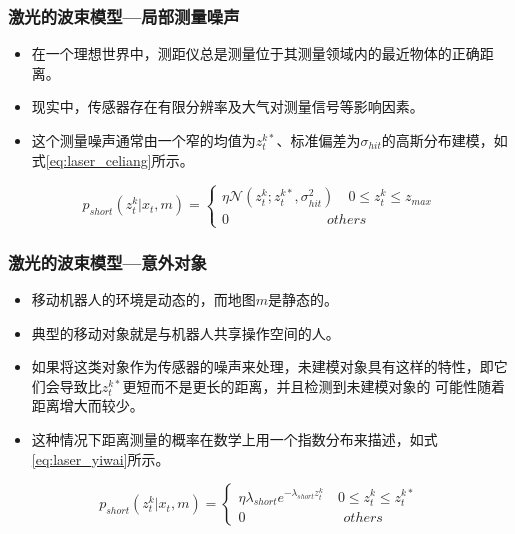 \begin{frame}
  \frametitle{激光的波束模型---局部测量噪声}
  
  \begin{itemize}
    \item 在一个理想世界中，测距仪总是测量位于其测量领域内的最近物体的正确距离。
    \item 现实中，{\color{red}传感器存在有限分辨率及大气对测量信号等影响因素}。
    \item 这个测量噪声通常由一个窄的均值为$z_t^{k*}$、标准偏差为$\sigma_{hit}$的高斯分布建模，如式\ref{eq:laser_celiang}所示。
  \end{itemize}

  \begin{equation}
    p_{short}(z_t^k | x_t, m) = 
    \begin{cases}
      \eta \mathcal{N}(z_t^k; z_t^{k*}, \sigma_{hit}^2) \quad  0 \leq z_t^k \leq z_{max}\\
      0 \qquad \qquad \qquad \quad others
    \end{cases}
    \label{eq:laser_celiang}
  \end{equation}
  

\end{frame}

\begin{frame}
  \frametitle{激光的波束模型---意外对象}
  \begin{itemize}
    \item 移动机器人的环境是动态的，而地图$m$是静态的。
    \item {\color{red}典型的移动对象就是与机器人共享操作空间的人}。
    \item 如果将这类对象作为传感器的噪声来处理，未建模对象具有这样的特性，即它们会导致比$z_t^{k*}$更短而不是更长的距离，并且检测到未建模对象的
          可能性随着距离增大而较少。
    \item 这种情况下距离测量的概率在数学上用一个指数分布来描述，如式\ref{eq:laser_yiwai}所示。
  \end{itemize}

  \begin{equation}
    p_{short}(z_t^k | x_t, m) = 
    \begin{cases}
      \eta \lambda_{short} e^{-\lambda_{short} z_t^k} \quad  0 \leq z_t^k \leq z_t^{k*}\\
      0 \qquad \qquad \qquad \quad others
    \end{cases}
    \label{eq:laser_yiwai}
  \end{equation}
\end{frame}

